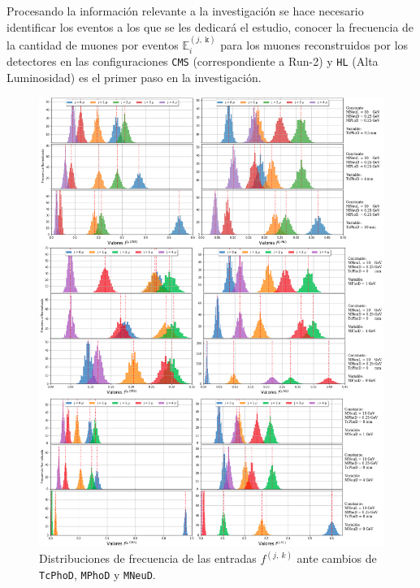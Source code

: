 
Procesando la información relevante a la investigación se hace necesario identificar los eventos a los que se les dedicará el estudio, conocer la frecuencia de la cantidad de muones por eventos $\mathbb{E}_i^{(j,~\mathtt{k})}$ para los muones reconstruidos por los detectores en las configuraciones \texttt{CMS} (correspondiente a Run-2) y \texttt{HL} (Alta Luminosidad) es el primer paso en la investigación.

\begin{figure}[h!]
\centering
\includegraphics[width=.92\textwidth]{Simulacion/imagenes/Distribucion_EntriesALL.png}
\caption{Distribuciones de frecuencia de las entradas $f^{(j,~k)}$ ante cambios de \texttt{TcPhoD}, \texttt{MPhoD} y  \texttt{MNeuD}.}
\label{entradas}
\end{figure}


